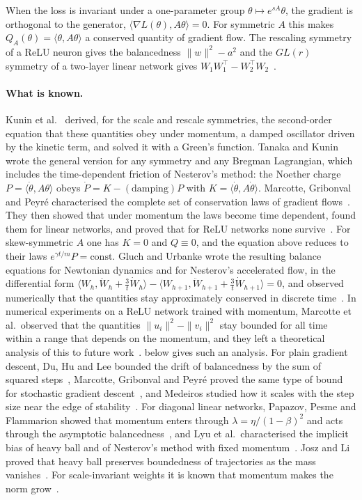 \documentclass[11pt]{article}
\theoremstyle{remark}
\theoremstyle{definition}
\newcommand{\ip}[2]{\langle #1,#2\rangle}
\begin{document}
When the loss is invariant under a one-parameter group $\theta\mapsto e^{sA}\theta$, the gradient is orthogonal to the generator, $\ip{\nabla L(\theta)}{A\theta}=0$. For symmetric $A$ this makes $Q_A(\theta)=\ip{\theta}{A\theta}$ a conserved quantity of gradient flow. The rescaling symmetry of a ReLU neuron gives the balancedness $\|w\|^2-a^2$ and the $GL(r)$ symmetry of a two-layer linear network gives $W_1W_1^\top-W_2^\top W_2$~\cite{du2018,arora2018}.

\paragraph{What is known.} Kunin et al.~\cite{kunin2021} derived, for the scale and rescale symmetries, the second-order equation that these quantities obey under momentum, a damped oscillator driven by the kinetic term, and solved it with a Green's function. Tanaka and Kunin~\cite{tanaka2021} wrote the general version for any symmetry and any Bregman Lagrangian, which includes the time-dependent friction of Nesterov's method: the Noether charge $P=\ip{\dot\theta}{A\theta}$ obeys $\dot P=K-(\text{damping})P$ with $K=\ip{\dot\theta}{A\dot\theta}$. Marcotte, Gribonval and Peyr\'e characterised the complete set of conservation laws of gradient flows~\cite{marcotte2023}. They then showed that under momentum the laws become time dependent, found them for linear networks, and proved that for ReLU networks none survive~\cite{marcotte2024}. For skew-symmetric $A$ one has $K=0$ and $Q\equiv0$, and the equation above reduces to their laws $e^{\gamma t/m}P=\text{const}$. Gluch and Urbanke wrote the resulting balance equations for Newtonian dynamics and for Nesterov's accelerated flow, in the differential form $\ip{W_h}{\ddot W_h+\tfrac3t\dot W_h}-\ip{W_{h+1}}{\ddot W_{h+1}+\tfrac3t\dot W_{h+1}}=0$, and observed numerically that the quantities stay approximately conserved in discrete time~\cite{gluch2021}. In numerical experiments on a ReLU network trained with momentum, Marcotte et al.\ observed that the quantities $\|u_i\|^2-\|v_i\|^2$ stay bounded for all time within a range that depends on the momentum, and they left a theoretical analysis of this to future work~\cite[Appendix N]{marcotte2024}.  below gives such an analysis. For plain gradient descent, Du, Hu and Lee bounded the drift of balancedness by the sum of squared steps~\cite{du2018}, Marcotte, Gribonval and Peyr\'e proved the same type of bound for stochastic gradient descent~\cite{marcotte2025}, and Medeiros studied how it scales with the step size near the edge of stability~\cite{medeiros2026}. For diagonal linear networks, Papazov, Pesme and Flammarion showed that momentum enters through $\lambda=\eta/(1-\beta)^2$ and acts through the asymptotic balancedness~\cite{papazov2024}, and Lyu et al.\ characterised the implicit bias of heavy ball and of Nesterov's method with fixed momentum~\cite{lyu2025}. Josz and Li proved that heavy ball preserves boundedness of trajectories as the mass vanishes~\cite{josz2024}. For scale-invariant weights it is known that momentum makes the norm grow~\cite{arora2019,wan2021}.
\end{document}
